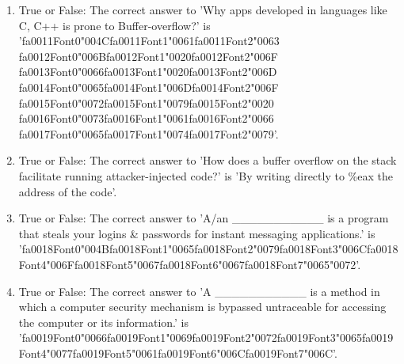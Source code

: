 \documentclass[12pt]{article}
\begin{document}
\begin{enumerate}[label=\arabic*.]
\item True or False: The correct answer to 'Why apps developed in languages like C, C++ is prone to Buffer-overflow?' is '{\csname fa0011Font0\endcsname\char"004C}{\csname fa0011Font1\endcsname\char"0061}{\csname fa0011Font2\endcsname\char"0063} {\csname fa0012Font0\endcsname\char"006B}{\csname fa0012Font1\endcsname\char"0020}{\csname fa0012Font2\endcsname\char"006F} {\csname fa0013Font0\endcsname\char"0066}{\csname fa0013Font1\endcsname\char"0020}{\csname fa0013Font2\endcsname\char"006D} {\csname fa0014Font0\endcsname\char"0065}{\csname fa0014Font1\endcsname\char"006D}{\csname fa0014Font2\endcsname\char"006F} {\csname fa0015Font0\endcsname\char"0072}{\csname fa0015Font1\endcsname\char"0079}{\csname fa0015Font2\endcsname\char"0020} {\csname fa0016Font0\endcsname\char"0073}{\csname fa0016Font1\endcsname\char"0061}{\csname fa0016Font2\endcsname\char"0066} {\csname fa0017Font0\endcsname\char"0065}{\csname fa0017Font1\endcsname\char"0074}{\csname fa0017Font2\endcsname\char"0079}'.
\item True or False: The correct answer to 'How does a buffer overflow on the stack facilitate running attacker-injected code?' is 'By writing directly to \%eax the address of the code'.
\item True or False: The correct answer to 'A/an \_\_\_\_\_\_\_\_\_\_\_ is a program that steals your logins \& passwords for instant messaging applications.' is '{\csname fa0018Font0\endcsname\char"004B}{\csname fa0018Font1\endcsname\char"0065}{\csname fa0018Font2\endcsname\char"0079}{\csname fa0018Font3\endcsname\char"006C}{\csname fa0018Font4\endcsname\char"006F}{\csname fa0018Font5\endcsname\char"0067}{\csname fa0018Font6\endcsname\char"0067}{\csname fa0018Font7\endcsname\char"0065}{\char"0072}'.
\item True or False: The correct answer to 'A \_\_\_\_\_\_\_\_\_\_\_ is a method in which a computer security mechanism is bypassed untraceable for accessing the computer or its information.' is '{\csname fa0019Font0\endcsname\char"0066}{\csname fa0019Font1\endcsname\char"0069}{\csname fa0019Font2\endcsname\char"0072}{\csname fa0019Font3\endcsname\char"0065}{\csname fa0019Font4\endcsname\char"0077}{\csname fa0019Font5\endcsname\char"0061}{\csname fa0019Font6\endcsname\char"006C}{\csname fa0019Font7\endcsname\char"006C}'.

\end{enumerate}
\end{document}
